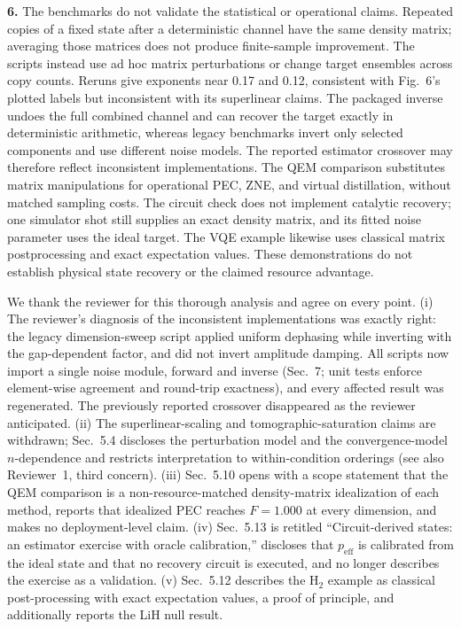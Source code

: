 \documentclass[11pt,a4paper]{article}
\newcommand{\rev}[1]{{\color{black}#1}}
\newcommand{\resp}[1]{{\color{red}#1}}
\begin{document}
\rev{\textbf{6.} The benchmarks do not validate the statistical or operational claims. Repeated copies of a fixed state after a deterministic channel have the same density matrix; averaging those matrices does not produce finite-sample improvement. The scripts instead use ad hoc matrix perturbations or change target ensembles across copy counts. Reruns give exponents near 0.17 and 0.12, consistent with Fig.~6's plotted labels but inconsistent with its superlinear claims. The packaged inverse undoes the full combined channel and can recover the target exactly in deterministic arithmetic, whereas legacy benchmarks invert only selected components and use different noise models. The reported estimator crossover may therefore reflect inconsistent implementations. The QEM comparison substitutes matrix manipulations for operational PEC, ZNE, and virtual distillation, without matched sampling costs. The circuit check does not implement catalytic recovery; one simulator shot still supplies an exact density matrix, and its fitted noise parameter uses the ideal target. The VQE example likewise uses classical matrix postprocessing and exact expectation values. These demonstrations do not establish physical state recovery or the claimed resource advantage.}

\resp{We thank the reviewer for this thorough analysis and agree on every point. (i) The reviewer's diagnosis of the inconsistent implementations was exactly right: the legacy dimension-sweep script applied uniform dephasing while inverting with the gap-dependent factor, and did not invert amplitude damping. All scripts now import a single noise module, forward and inverse (Sec.~7; unit tests enforce element-wise agreement and round-trip exactness), and every affected result was regenerated. The previously reported crossover disappeared as the reviewer anticipated. (ii) The superlinear-scaling and tomographic-saturation claims are withdrawn; Sec.~5.4 discloses the perturbation model and the convergence-model $n$-dependence and restricts interpretation to within-condition orderings (see also Reviewer~1, third concern). (iii) Sec.~5.10 opens with a scope statement that the QEM comparison is a non-resource-matched density-matrix idealization of each method, reports that idealized PEC reaches $F = 1.000$ at every dimension, and makes no deployment-level claim. (iv) Sec.~5.13 is retitled ``Circuit-derived states: an estimator exercise with oracle calibration,'' discloses that $p_\mathrm{eff}$ is calibrated from the ideal state and that no recovery circuit is executed, and no longer describes the exercise as a validation. (v) Sec.~5.12 describes the H$_2$ example as classical post-processing with exact expectation values, a proof of principle, and additionally reports the LiH null result.}
\end{document}
